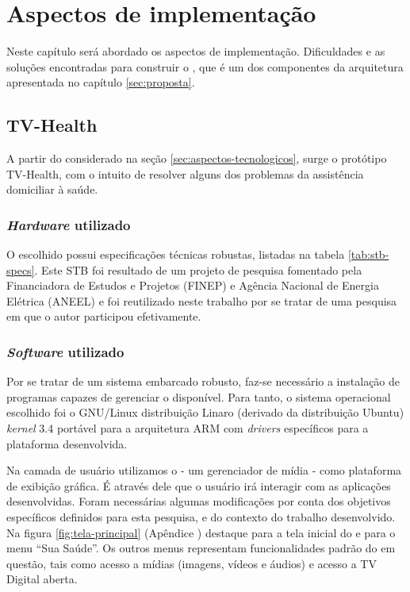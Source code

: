 \chapter{Aspectos de implementação}\label{cap:aspectos-de-implementacao}

Neste capítulo será abordado os aspectos de implementação. Dificuldades e as
soluções encontradas para construir o \software, que é um dos componentes
da arquitetura apresentada no capítulo \vref{sec:proposta}.

\section{TV-Health} \label{sec:tv-health} 

A partir do considerado na seção \ref{sec:aspectos-tecnologicos}, surge o
protótipo TV-Health, com o intuito de resolver alguns dos problemas da
assistência domiciliar à saúde.

\subsection{\textit{Hardware} utilizado}

O \stb[] escolhido possui especificações técnicas robustas, listadas na 
tabela \ref{tab:stb-specs}. Este STB foi resultado de um projeto de pesquisa
fomentado pela Financiadora de Estudos e Projetos (FINEP) e Agência Nacional
de Energia Elétrica (ANEEL) e foi reutilizado neste trabalho por se tratar de 
uma pesquisa em que o autor participou efetivamente.


\subsection{\textit{Software} utilizado}

Por se tratar de um sistema embarcado robusto, faz-se necessário a instalação
de programas capazes de gerenciar o \hardware[] disponível. Para tanto, o
sistema operacional escolhido foi o GNU/Linux distribuição Linaro (derivado da
distribuição Ubuntu) \textit{kernel} 3.4 portável para a arquitetura 
ARM com \textit{drivers} específicos para a plataforma desenvolvida.


Na camada de usuário utilizamos o \software[] \xbmc[] - um gerenciador de mídia
- como plataforma de exibição gráfica. É através dele que o usuário irá 
interagir com as aplicações desenvolvidas. Foram necessárias algumas 
modificações por conta dos objetivos específicos definidos para esta pesquisa,
e do contexto do trabalho desenvolvido. Na figura \ref{fig:tela-principal}
(Apêndice )
destaque para a tela inicial do \software[] \xbmc[] e para o menu ``Sua Saúde''.
Os outros menus representam funcionalidades padrão do \software[] em questão,
tais como acesso a mídias (imagens, vídeos e áudios) e acesso a TV Digital aberta.

